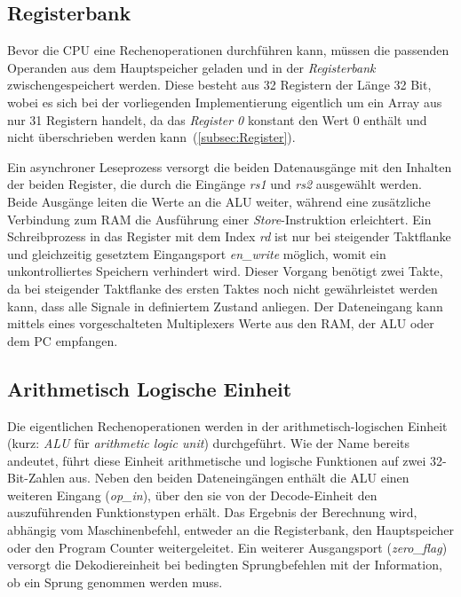 \subsection{Registerbank}

Bevor die CPU eine Rechenoperationen durchführen kann, müssen die passenden Operanden aus dem Hauptspeicher geladen und in der \textit{Registerbank} zwischengespeichert werden.
Diese besteht aus 32 Registern der Länge 32 Bit, wobei es sich bei der vorliegenden Implementierung eigentlich um ein Array aus nur 31 Registern handelt, da das \textit{Register 0} konstant den Wert $0$ enthält und nicht überschrieben werden kann~(\ref{subsec:Register}).

Ein asynchroner Leseprozess versorgt die beiden Datenausgänge mit den Inhalten der beiden Register, die durch die Eingänge \textit{rs1} und \textit{rs2} ausgewählt werden.
Beide Ausgänge leiten die Werte an die ALU weiter, während eine zusätzliche Verbindung zum RAM die Ausführung einer \textit{Store}-Instruktion erleichtert.
Ein Schreibprozess in das Register mit dem Index \textit{rd} ist nur bei steigender Taktflanke und gleichzeitig gesetztem Eingangsport \textit{en\_write} möglich, womit ein unkontrolliertes Speichern verhindert wird.
Dieser Vorgang benötigt zwei Takte, da bei steigender Taktflanke des ersten Taktes noch nicht gewährleistet werden kann, dass alle Signale in definiertem Zustand anliegen.
Der Dateneingang kann mittels eines vorgeschalteten Multiplexers Werte aus den RAM, der ALU oder dem PC empfangen.



\subsection{Arithmetisch Logische Einheit}

Die eigentlichen Rechenoperationen werden in der arithmetisch-logischen Einheit (kurz: \textit{ALU} für \textit{arithmetic logic unit}) durchgeführt.
Wie der Name bereits andeutet, führt diese Einheit arithmetische und logische Funktionen auf zwei 32-Bit-Zahlen aus.
Neben den beiden Dateneingängen enthält die ALU einen weiteren Eingang (\textit{op\_in}), über den sie von der Decode-Einheit den auszuführenden Funktionstypen erhält.
Das Ergebnis der Berechnung wird, abhängig vom Maschinenbefehl, entweder an die Registerbank, den Hauptspeicher oder den Program Counter weitergeleitet.
Ein weiterer Ausgangsport (\textit{zero\_flag}) versorgt die Dekodiereinheit bei bedingten Sprungbefehlen mit der Information, ob ein Sprung genommen werden muss. 

